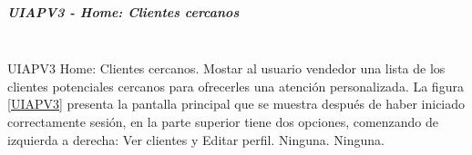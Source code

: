 \subparagraph{UIAPV3 - Home: Clientes cercanos} ~\\

{UIAPV3} %
{Home: Clientes cercanos.}  %
{Mostar al usuario vendedor una lista de los clientes potenciales cercanos para ofrecerles una atención personalizada.} %
{La figura \ref{UIAPV3} presenta la pantalla principal que se muestra después de haber iniciado correctamente sesión, en la parte superior tiene dos opciones, comenzando de izquierda a derecha: Ver clientes y Editar perfil.} %
{Ninguna.} %
{Ninguna.} %



